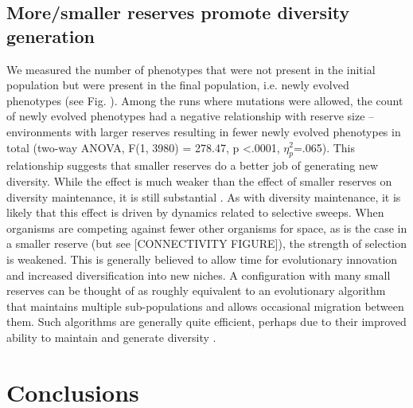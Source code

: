 \documentclass[letterpaper]{article}
\begin{document}
\subsection{More/smaller reserves promote diversity generation}
        
		We measured the number of phenotypes that were not present in the initial population but were present in the final population, i.e. newly evolved phenotypes (see Fig. \label{fig:diversitygenerationmaintenance}). Among the runs where mutations were allowed, the count of newly evolved phenotypes had a negative relationship with reserve size – environments with larger reserves resulting in fewer newly evolved phenotypes in total (two-way ANOVA, F(1, 3980) = 278.47, p \textless .0001, $\eta_{p}^{2}$=.065). This relationship suggests that smaller reserves do a better job of generating new diversity. While the effect is much weaker than the effect of smaller reserves on diversity maintenance, it is still substantial \citep{lakens_calculating_2013}. As with diversity maintenance, it is likely that this effect is driven by dynamics related to selective sweeps. When organisms are competing against fewer other organisms for space, as is the case in a smaller reserve (but see [CONNECTIVITY FIGURE]), the strength of selection is weakened. This is generally believed to allow time for evolutionary innovation and increased diversification into new niches. A configuration with many small reserves can be thought of as roughly equivalent to an evolutionary algorithm that maintains multiple sub-populations and allows occasional migration between them. Such algorithms are generally quite efficient, perhaps due to their improved ability to maintain and generate diversity \citep{tomassini_spatially_2005}. 
%
%
%
%
%
%

\section{Conclusions}
\end{document}
